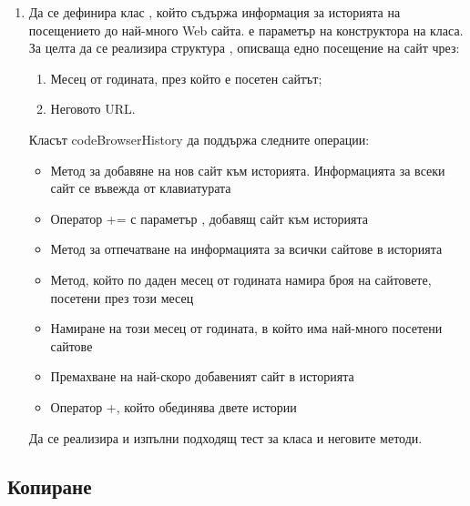 \begin{enumerate}
\begin{lstlisting}
\end{lstlisting}



\item \label{zad:browser} Да се дефинира клас , който съдържа информация за историята на посещението до най-много  Web сайта.  е параметър на конструктора на класа. За целта да се реализира структура , описваща едно посещение на сайт чрез:

\begin{enumerate}[label=\alph*)]
	\item Месец от годината, през който е посетен сайтът;
	\item Неговото URL.
\end{enumerate}

Класът code{BrowserHistory} да поддържа следните операции:
\begin{itemize}
\item Метод за добавяне на нов сайт към историята. Информацията за всеки сайт се въвежда от клавиатурата
\item Оператор += с параметър , добавящ сайт към историята
\item Метод за отпечатване на информацията за всички сайтове в историята
\item Метод, който по даден месец от годината намира броя на сайтовете, посетени през този месец
\item Намиране на този месец от годината, в който има най-много посетени сайтове
\item Премахване на най-скоро добавеният сайт в историята
\item Оператор +, който обединява двете истории
\end{itemize}

Да се реализира и изпълни подходящ тест за класа и неговите методи.

\end{enumerate}

\pagebreak

\subsection{Копиране}

